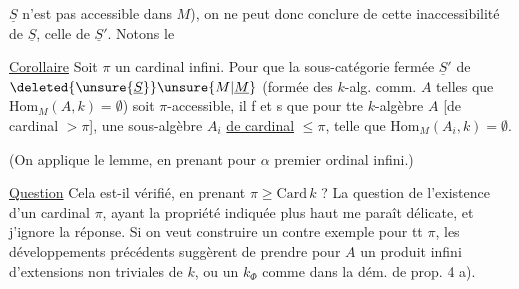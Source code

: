 
$\underline S$ n'est pas accessible dans $M$), on ne peut donc
conclure de cette inaccessibilité de $\underline S$, celle de
$\underline S'$. Notons le

\uline{Corollaire} Soit $\pi$ un cardinal infini. Pour que la
sous-catégorie fermée $\underline S'$ de
$\deleted{\unsure{\underline S}}\unsure{M|\underline M}$ (formée
des  $k$-alg. comm. $A$ telles que
$\mathrm{Hom}_M(A,k)=\emptyset$) soit $\pi$-accessible, il f et s
que pour tte $k$-algèbre $A$ [de cardinal $>\pi$],
 une sous-algèbre $A_i$
\uline{de cardinal} $\leq\pi$, telle que
$\mathrm{Hom}_M(A_i,k)=\emptyset$.

(On applique le lemme, en prenant pour $\alpha$  premier
ordinal infini.)

\uline{Question} Cela est-il vérifié, en prenant 
$\pi\geq\mathrm{Card}\,k$ ? La question de l'existence
d'un cardinal $\pi$, ayant la propriété indiquée plus haut me paraît
délicate, et j'ignore la réponse. Si on veut construire un
contre exemple pour tt $\pi$, les développements précédents suggèrent
de prendre pour $A$ un produit infini d'extensions non triviales de
$k$, ou un  $k_{\Phi}$ comme dans
la dém. de prop. 4 a).
